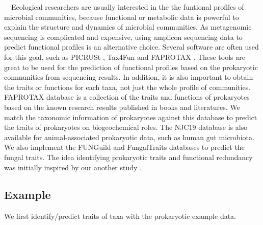 \documentclass[
]{book}
\newenvironment{Shaded}{\begin{snugshade}}{\end{snugshade}}
\newcommand{\AttributeTok}[1]{\textcolor[rgb]{0.13,0.29,0.53}{#1}}
\newcommand{\CommentTok}[1]{\textcolor[rgb]{0.56,0.35,0.01}{\textit{#1}}}
\newcommand{\FunctionTok}[1]{\textcolor[rgb]{0.13,0.29,0.53}{\textbf{#1}}}
\newcommand{\NormalTok}[1]{#1}
\newcommand{\OtherTok}[1]{\textcolor[rgb]{0.56,0.35,0.01}{#1}}
\newcommand{\SpecialCharTok}[1]{\textcolor[rgb]{0.81,0.36,0.00}{\textbf{#1}}}
\newcommand{\StringTok}[1]{\textcolor[rgb]{0.31,0.60,0.02}{#1}}
\begin{document}
　Ecological researchers are usually interested in the the funtional profiles of microbial communities,
because functional or metabolic data is powerful to explain the structure and dynamics of microbial communities.
As metagenomic sequencing is complicated and expensive, using amplicon sequencing data to predict functional profiles is an alternative choice.
Several software are often used for this goal, such as PICRUSt \citep{Langille_Predictive_2013}, Tax4Fun \citep{Aßhauer_Tax4Fun_2015} and FAPROTAX \citep{Louca_High_2016, Louca_Decoupling_2016}.
These tools are great to be used for the prediction of functional profiles based on the prokaryotic communities from sequencing results.
In addition, it is also important to obtain the traits or functions for each taxa, not just the whole profile of communities.
FAPROTAX database is a collection of the traits and functions of prokaryotes based on the known research results published in books and literatures.
We match the taxonomic information of prokaryotes against this database to predict the traits of prokaryotes on biogeochemical roles.
The NJC19 database \citep{Lim_Large_2020} is also available for animal-associated prokaryotic data, such as human gut microbiota.
We also implement the FUNGuild \citep{Nguyen_FUNGuild_2016} and FungalTraits \citep{Polme_FungalTraits_2020} databases to predict the fungal traits.
The idea identifying prokaryotic traits and functional redundancy was initially inspired by our another study \citep{Liu_Microbial_2022}.

\subsection{Example}\label{example-9}

We first identify/predict traits of taxa with the prokaryotic example data.

\begin{Shaded}
\end{Shaded}
\end{document}

